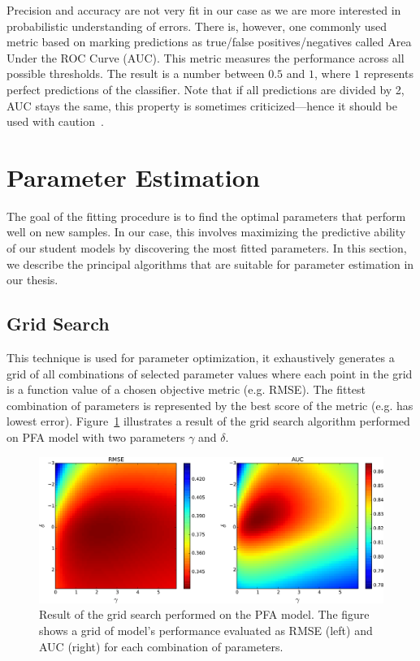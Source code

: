 Precision and accuracy are not very fit in our case as we are more interested in probabilistic understanding of errors. There is, however, one commonly used metric based on marking predictions as true/false positives/negatives called Area Under the ROC Curve (AUC). This metric measures the performance across all possible thresholds. The result is a number between $0.5$ and $1$, where $1$ represents perfect predictions of the classifier. Note that if all predictions are divided by 2, AUC stays the same, this property is sometimes criticized---hence it should be used with caution~\cite{Pelanek2015a}.

\section{Parameter Estimation}
\label{parameter-estimation}

The goal of the fitting procedure is to find the optimal parameters that perform well on new samples. In our case, this involves maximizing the predictive ability of our student models by discovering the most fitted parameters. In this section, we describe the principal algorithms that are suitable for parameter estimation in our thesis.

\subsection{Grid Search}
\label{grid-search}

This technique is used for parameter optimization, it exhaustively generates a grid of all combinations of selected parameter values where each point in the grid is a function value of a chosen objective metric (e.g. RMSE). The fittest combination of parameters is represented by the best score of the metric (e.g. has lowest error). Figure~\ref{fig-grid-search-rmse-auc} illustrates a result of the grid search algorithm performed on PFA model with two parameters $\gamma$ and $\delta$.

\begin{figure}[htbp]
  \centering
  \includegraphics[width=\textwidth]{img/pfa-grid-search-rmse-auc}
  \caption{Result of the grid search performed on the PFA model. The figure shows a grid of model's performance evaluated as RMSE (left) and AUC (right) for each combination of parameters.}
  \label{fig-grid-search-rmse-auc}
\end{figure}

